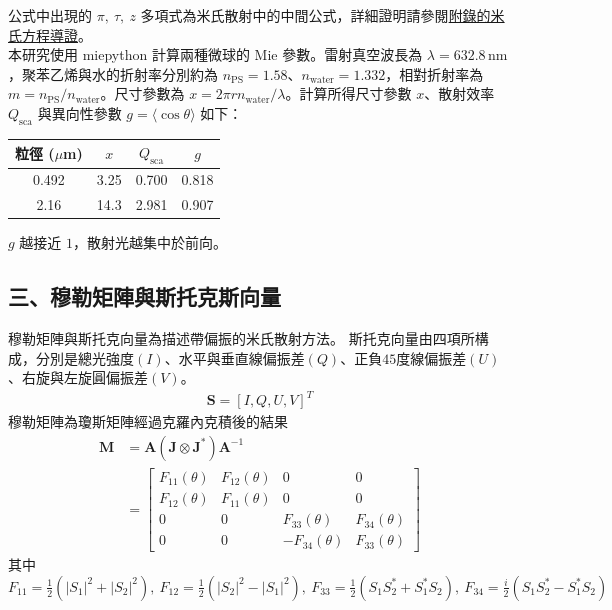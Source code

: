 公式中出現的 $\pi,\ \tau,\ z$ 多項式為米氏散射中的中間公式，詳細證明請參閱\hyperlink{subsec:mie}{附錄的米氏方程導證}。
\\
本研究使用 miepython 計算兩種微球的 Mie 參數。雷射真空波長為 $\lambda=632.8\,\mathrm{nm}$，聚苯乙烯與水的折射率分別約為 $n_{\mathrm{PS}}=1.58$、$n_{\mathrm{water}}=1.332$，相對折射率為 $m=n_{\mathrm{PS}}/n_{\mathrm{water}}$。尺寸參數為 $x=2\pi r n_{\mathrm{water}}/\lambda$。計算所得尺寸參數 $x$、散射效率 $Q_{\mathrm{sca}}$ 與異向性參數 $g=\langle\cos\theta\rangle$ 如下：
\begin{center}
\begin{tabular}{cccc}
    \toprule
    粒徑 ($\mu$m) & $x$ & $Q_{\mathrm{sca}}$ & $g$ \\
    \midrule
    0.492 & 3.25 & 0.700 & 0.818 \\
    2.16 & 14.3 & 2.981 & 0.907 \\
    \bottomrule
\end{tabular}
\end{center}
$g$ 越接近 $1$，散射光越集中於前向。

\subsection*{三、穆勒矩陣與斯托克斯向量}
穆勒矩陣與斯托克向量為描述帶偏振的米氏散射方法\parencite{stokes1852Composition,bohren1983Absorption}。
斯托克向量由四項所構成，分別是總光強度$(I)$、水平與垂直線偏振差$(Q)$、正負$45$度線偏振差$(U)$、右旋與左旋圓偏振差$(V)$。
\begin{align}
    \mathbf{S} = {\left[I, Q, U, V\right]}^T
\end{align}
穆勒矩陣為瓊斯矩陣\parencite{jones1941NewCalculus}經過克羅內克積後的結果\parencite{azzam1977Ellipsometry}
\begin{align}
    \mathbf{M} &= \mathbf{A} \left(\mathbf{J}\otimes\mathbf{J}^*\right) \mathbf{A}^{-1}\\
               &=\begin{bmatrix} F_{11}(\theta) & F_{12}(\theta) & 0 & 0 \\ F_{12}(\theta) & F_{11}(\theta) & 0 & 0 \\ 0 & 0 & F_{33}(\theta) & F_{34}(\theta) \\ 0 & 0 & -F_{34}(\theta) & F_{33}(\theta) \end{bmatrix}
\end{align}
其中$F_{11}=\frac{1}{2}(|S_1|^2+|S_2|^2),\ F_{12}=\frac{1}{2}(|S_2|^2-|S_1|^2),\ F_{33}=\frac{1}{2}(S_1S_2^* + S_1^*S_2),\ F_{34}=\frac{i}{2}(S_1S_2^* - S_1^*S_2)$

